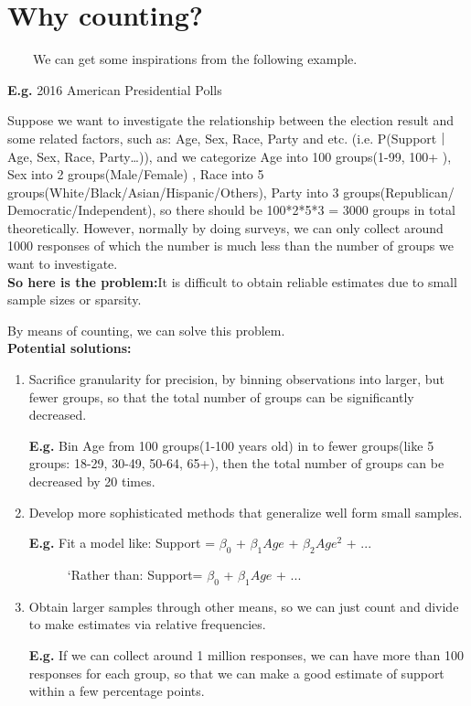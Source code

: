 
\section{Why counting?}

~~~~We can get some inspirations from the following example.

\textbf{E.g.} 2016 American Presidential Polls

Suppose we want to investigate the relationship between the election result and some related factors, such as: Age, Sex, Race, Party and etc. (i.e. P(Support｜Age, Sex, Race, Party…)), and we categorize Age into 100 groups(1-99, 100+ ), Sex into 2 groups(Male/Female) , Race into 5 groups(White/Black/Asian/Hispanic/Others), Party into 3 groups(Republican/ Democratic/Independent), so there should be 100*2*5*3 = 3000 groups in total theoretically. However, normally by doing surveys, we can only collect around 1000 responses of which the number is much less than the number of groups we want to investigate.
~\\

\textbf{So here is the problem:}It is difficult to obtain reliable estimates due to small sample sizes or sparsity.

By means of counting, we can solve this problem.
~\\

\textbf{Potential solutions:}
\begin{enumerate}
\item Sacrifice granularity for precision, by binning observations into larger, but fewer groups, so that the total number of groups can be significantly decreased.

\textbf{E.g.} Bin Age from 100 groups(1-100 years old) in to fewer groups(like 5 groups: 18-29, 30-49, 50-64, 65+), then the total number of groups can be decreased by 20 times.

\item Develop more sophisticated methods that generalize well form small samples.

\textbf{E.g.} Fit a model like:  Support = $\beta_0$ + $\beta_1Age$ + $\beta_2Age^2$ + $...$

~~~~~~`Rather than:  Support= $\beta_0$ + $\beta_1Age$ + $...$

\item Obtain larger samples through other means, so we can just count and divide to make estimates via relative frequencies.

\textbf{E.g. }If we can collect around 1 million responses, we can have more than 100 responses for each group, so that we can make a good estimate of support within a few percentage points.
\end{enumerate}


